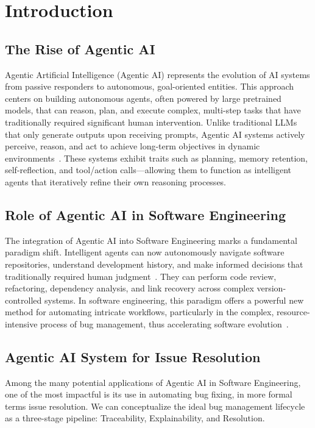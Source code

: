 \section{Introduction}

\subsection{The Rise of Agentic AI}

Agentic Artificial Intelligence (Agentic AI) represents the evolution of AI systems from passive responders to autonomous, goal-oriented entities. This approach centers on building autonomous agents, often powered by large pretrained models, that can reason, plan, and execute complex, multi-step tasks that have traditionally required significant human intervention. Unlike traditional LLMs that only generate outputs upon receiving prompts, Agentic AI systems actively perceive, reason, and act to achieve long-term objectives in dynamic environments~\cite{gpt,bert}. These systems exhibit traits such as planning, memory retention, self-reflection, and tool/action calls—allowing them to function as intelligent agents that iteratively refine their own reasoning processes.

\subsection*{Role of Agentic AI in Software Engineering}

The integration of Agentic AI into Software Engineering marks a fundamental paradigm shift. Intelligent agents can now autonomously navigate software repositories, understand development history, and make informed decisions that traditionally required human judgment~\cite{traceability,btlink}. They can perform code review, refactoring, dependency analysis, and link recovery across complex version-controlled systems. In software engineering, this paradigm offers a powerful new method for automating intricate workflows, particularly in the complex, resource-intensive process of bug management, thus accelerating software evolution~\cite{dataset,commit_3}.

\subsection*{Agentic AI System for Issue Resolution}

Among the many potential applications of Agentic AI in Software Engineering, one of the most impactful is its use in automating bug fixing, in more formal terms issue resolution. We can conceptualize the ideal bug management lifecycle as a three-stage pipeline: Traceability, Explainability, and Resolution.

